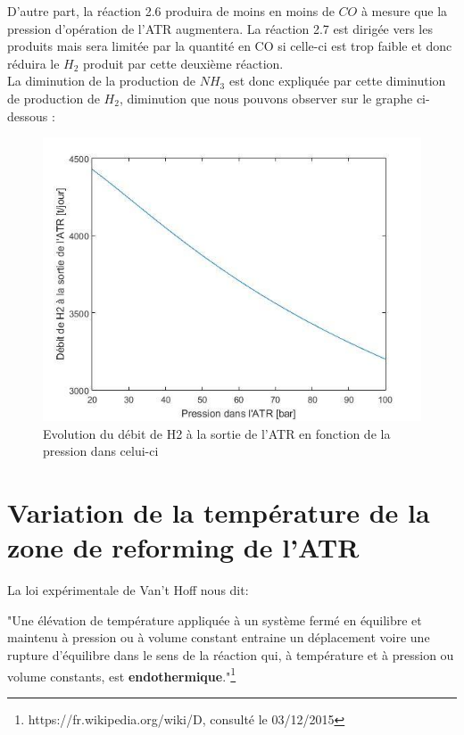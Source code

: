 \documentclass[12pt]{report}
\begin{document}
 D'autre part, la réaction 2.6 produira de moins en moins de $CO$ à mesure que la pression d'opération de l'ATR augmentera. La réaction 2.7 est dirigée vers les produits mais sera limitée par la quantité en CO si celle-ci est trop faible et donc réduira le $H_2$ produit par cette deuxième réaction.\\

La diminution de la production de $NH_3$ est donc expliquée par cette diminution de production de $H_2$, diminution que nous pouvons observer sur le graphe ci-dessous :
\begin{figure}[H]
\begin{center}
\includegraphics[scale=0.6]{debit_H2_ATR_pression_ATR}
\caption{Evolution du débit de H2 à la sortie de l'ATR en fonction de la pression dans celui-ci}
\end{center}
\end{figure}


\section{Variation de la température de la zone de reforming de l'ATR}

La loi expérimentale de Van't Hoff nous dit:


\begin{center}
"Une élévation de température appliquée à un système fermé en équilibre et maintenu à pression ou à volume constant entraine un déplacement voire une rupture d'équilibre dans le sens de la réaction qui, à température et à pression ou volume constants, est \textbf{endothermique}."\footnote{https://fr.wikipedia.org/wiki/D, consulté le 03/12/2015}
\end{center} 
\end{document}
